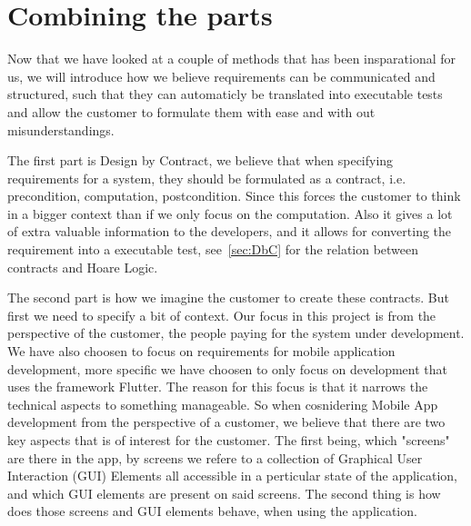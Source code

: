 \section{Combining the parts}
Now that we have looked at a couple of methods that has been insparational for us, we will introduce how we believe requirements can be communicated and structured, such that they can automaticly be translated into executable tests and allow the customer to formulate them with ease and with out misunderstandings.

The first part is Design by Contract, we believe that when specifying requirements for a system, they should be formulated as a contract, i.e. precondition, computation, postcondition. 
Since this forces the customer to think in a bigger context than if we only focus on the computation.
Also it gives a lot of extra valuable information to the developers, and it allows for converting the requirement into a executable test, see~\autoref{sec:DbC} for the relation between contracts and Hoare Logic.

The second part is how we imagine the customer to create these contracts. 
But first we need to specify a bit of context.
Our focus in this project is from the perspective of the customer, the people paying for the system under development.
We have also choosen to focus on requirements for mobile application development, more specific we have choosen to only focus on development that uses the framework Flutter.
The reason for this focus is that it narrows the technical aspects to something manageable.
So when cosnidering Mobile App development from the perspective of a customer, we believe that there are two key aspects that is of interest for the customer.
The first being, which "screens" are there in the app, by screens we refere to a collection of Graphical User Interaction (GUI) Elements all accessible in a perticular state of the application, and which GUI elements are present on said screens.
The second thing is how does those screens and GUI elements behave, when using the application.

